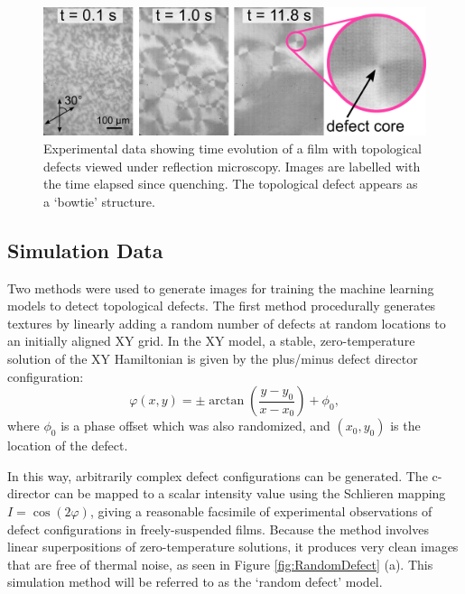 \documentclass[twoside,twocolumn,9pt]{article}
\begin{document}
\begin{figure}[h!]
  \includegraphics[width=\linewidth]{qM.png}
  \caption{Experimental data showing time evolution of a film with topological defects viewed under reflection microscopy. Images are labelled with the time elapsed since quenching. The topological defect appears as a `bowtie' structure.}
  \label{fig:frames}
\end{figure}

\subsection{Simulation Data}

Two methods were used to generate images for training the machine learning models to detect topological defects. 
The first method procedurally generates textures by linearly adding a random number of defects at random locations to an initially aligned XY grid. In the XY model, a stable, zero-temperature solution of the XY Hamiltonian is given by the plus/minus defect director configuration:
\begin{equation}
\varphi(x,y) = \pm \arctan{\left(\frac{y-y_0}{x-x_0}\right)} + \phi_0, 
\end{equation}
where $\phi_0$ is a phase offset which was also randomized, and $(x_0,y_0)$ is the location of the defect.

In this way, arbitrarily complex defect configurations can be generated. The c-director can be mapped to a scalar intensity value using the Schlieren mapping $I = \cos(2\varphi)$, giving a reasonable facsimile of experimental observations of defect configurations in freely-suspended films. Because the method involves linear superpositions of zero-temperature solutions, it produces very clean images that are free of thermal noise, as seen in Figure \ref{fig:RandomDefect} (a). 
 This simulation method will be referred to as the `random defect' model.
\end{document}

